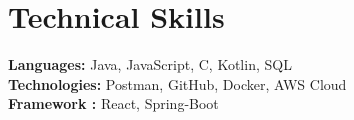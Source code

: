 \section{Technical Skills}
\begin{itemize}
	\small{
        \item {
        \textbf{Languages:} Java, JavaScript, C, Kotlin, SQL
        \vspace{3pt} \\
        \textbf{Technologies:} Postman, GitHub, Docker, AWS Cloud
        \vspace{3pt} \\
        \textbf{Framework :} React, Spring-Boot
        }
    }
\end{itemize}
